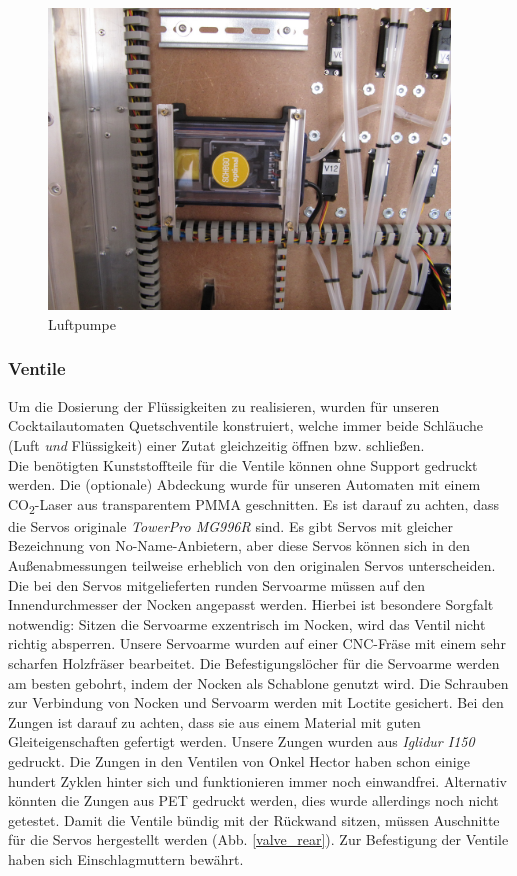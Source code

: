 \documentclass[a4paper]{scrartcl}
\begin{document}
\begin{figure}
  \centering
  \includegraphics[height=8cm]{pics/pump.JPG}
  \caption{Luftpumpe} \label{pump}
\end{figure}
\newpage

\subsubsection{Ventile}
Um die Dosierung der Flüssigkeiten zu realisieren, wurden für unseren Cocktailautomaten Quetschventile konstruiert, welche immer beide Schläuche (Luft \textit{und} Flüssigkeit) einer Zutat  gleichzeitig öffnen bzw. schließen. \\
Die benötigten Kunststoffteile für die Ventile können ohne Support gedruckt werden. Die (optionale) Abdeckung wurde für unseren Automaten mit einem CO\textsubscript{2}-Laser aus transparentem PMMA geschnitten.
Es ist darauf zu achten, dass die Servos originale \textit{TowerPro MG996R} sind. Es gibt Servos mit gleicher Bezeichnung von No-Name-Anbietern, aber diese Servos können sich in den Außenabmessungen teilweise erheblich von den originalen Servos unterscheiden. 
Die bei den Servos mitgelieferten runden Servoarme müssen auf den Innendurchmesser der Nocken angepasst werden. Hierbei ist besondere Sorgfalt notwendig: Sitzen die Servoarme exzentrisch im Nocken, wird das Ventil nicht richtig absperren. Unsere Servoarme wurden auf einer CNC-Fräse mit einem sehr scharfen Holzfräser bearbeitet. Die Befestigungslöcher für die Servoarme werden am besten gebohrt, indem der Nocken als Schablone genutzt wird. Die Schrauben zur Verbindung von Nocken und Servoarm werden mit Loctite gesichert. 
Bei den Zungen ist darauf zu achten, dass sie aus einem Material mit guten Gleiteigenschaften gefertigt werden. Unsere Zungen wurden aus \textit{Iglidur I150} gedruckt. Die Zungen in den Ventilen von Onkel Hector haben schon einige hundert Zyklen hinter sich und funktionieren immer noch einwandfrei. Alternativ könnten die Zungen aus PET gedruckt werden, dies wurde allerdings noch nicht getestet. 
Damit die Ventile bündig mit der Rückwand sitzen, müssen Auschnitte für die Servos hergestellt werden (Abb. \ref{valve_rear}). Zur Befestigung der Ventile haben sich Einschlagmuttern bewährt. 
\end{document}
